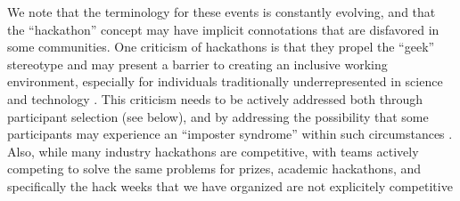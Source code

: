 We note that the terminology for these events is constantly evolving, and that the ``hackathon'' concept may have implicit connotations that are disfavored in some communities.
One criticism of hackathons is that they propel the ``geek'' stereotype and may present a barrier to creating an inclusive working environment, especially for individuals traditionally underrepresented in science and technology \cite{Decker2015}.
This criticism needs to be actively addressed both through participant selection (see below), and by addressing the possibility that some participants may experience an ``imposter syndrome'' within such circumstances \cite{clance1978imposter}.
Also, while many industry hackathons are competitive, with teams actively competing to solve the same problems for prizes, academic hackathons, and specifically the hack weeks that we have organized are not explicitely competitive
